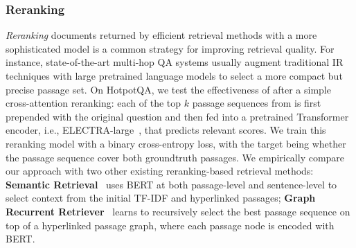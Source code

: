 \subsubsection{Reranking}
\label{sec:reranking}

\emph{Reranking} documents returned by efficient retrieval methods with a more sophisticated model is a common strategy for improving retrieval quality.
For instance, state-of-the-art multi-hop QA systems usually augment traditional IR techniques with large pretrained language models to select a more compact but precise passage set.
On HotpotQA, we test the effectiveness of \method after a simple cross-attention reranking: each of the top $k$ passage sequences from \method is first prepended with the original question and then fed into a pretrained Transformer encoder, i.e., ELECTRA-large~\citep{ELECTRA}, that predicts relevant scores. We train this reranking model with a binary cross-entropy loss, with the target being whether the passage sequence cover both groundtruth passages.
We empirically compare our approach with two other existing reranking-based retrieval methods:
\textbf{Semantic Retrieval}~\citep{SMR} uses BERT at both passage-level and sentence-level to select context from the initial TF-IDF and hyperlinked passages; \textbf{Graph Recurrent Retriever}~\citep{GraphRecurrentRetriever} learns to recursively select the best passage sequence on top of a hyperlinked passage graph, where each passage node is encoded with BERT.

